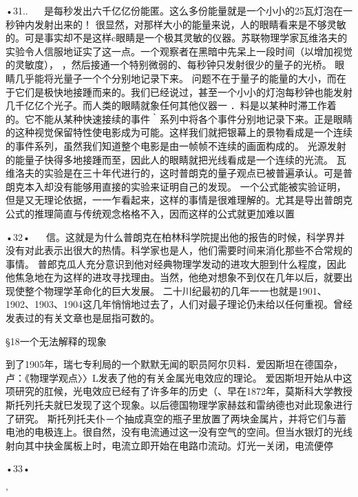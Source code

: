 •31..
  
是每秒发出六千亿亿份能匿。这么多份能量就是一个小小的25瓦灯泡在一秒钟内发射出来的！
很显然，对那样大小的能量来说，人的眼睛看来是不够灵敏的。可是事实却不是这样c眼睛是一个极其灵敏的仪器。苏联物理学家瓦维洛夫的实验令人信服地证实了这一点。一个观察者在黑暗中先呆上一段时间（以增加视觉的灵敏度），
，然后接通一个特别微弱的、每秒钟只发射很少的量子的光桥。
眼睛几乎能将光量子一个个分别地记录下来。
问题不在于量子的能量的大小，而在于它们是极快地接踵而来的。我们已经说过，甚至一个小小的灯泡每秒钟也能发射几千亿亿个光子。而人类的眼睛就象任何其他仪器一
．料是以某种时滞工作着的。它不能从某种快速接续的事件｀系列中将各个事件分别地记录下来。正是眼睛的这种视觉保留特性使电影成为可能。这样我们就把银幕上的景物看成是一个连续的事件系列，虽然我们知道整个电影是由一帧帧不连续的画面构成的。
光源发射的能量子快得多地接踵而至，因此人的眼睛就把光线看成是一个连续的光流。
瓦维洛夫的实验是在三十年代进行的，这时普朗克的量子观点已被普遍承认。可是普朗克本入却没有能够用直接的实验来证明自己的发现。
一个公式能被实验证明，但是又无理论依据，一一乍看起来，这样的事情是很难理解的。尤其是导出普朗克公式的推理简直与传统观念格格不入，因而这样的公式就更加难以置

•32•
  
信。这就是为什么普朗克在柏林科学院提出他的报告的时候，科学界并没有对此表示出很大的热情。科学家也是人，他们需要时间来消化那些不合常规的事情。
普郎克瓜人充分意识到他对经典物理学发动的进攻大胆到什么程度，因此他焦急地在为这样的进攻寻找理由。当然，他绝对想象不到仅在几年以后，就要出现使整个物理学革命化的巨大发展。
二十川纪最初的几年一一也就是1901、1902、1903、1904这几年悄悄地过去了，人们对最子理论仍未给以任何重视。曾经发表过的有关文章也是屈指可数的。

§18一个无法解释的现象

到了1905年，瑞七专利局的一个默默无闻的职员阿尔贝料．爱因斯坦在德国杂，卢：《物理学观点〉〉L发表了他的有关金属光电效应的理论。
爱因斯坦开始从中这项研究的肛候，光电效应已经有了许多年的历史（、早在1872年，莫斯科大学教授斯托列托夫就巳发现了这个现象。以后德国物理学家赫兹和雷纳德也对此现象进行了研究。
斯托列托夫仆－个抽成真空的瓶子里放置了两块金属片，并将它们与蓄电池的电极连上。很自然，没有电流通过这一没有空气的空间。但当水银灯的光线射向其中抉金属板上时，电流立即开始在电路巾流动。灯光一关闭，电流便停

•33•
  

'
 
